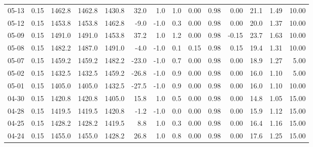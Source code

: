 \begin{threeparttable}
{\begin{tabular}{lrrrrrrrrrrrrr}
  05-13 &     0.15 & 1462.8 & 1462.8 & 1430.8 &       32.0 &                      1.0 &                 1.0 &       0.00 &      0.98 &           0.00 &             21.1 &            1.49 &                  10.00 \\
  05-12 &     0.15 & 1453.8 & 1453.8 & 1462.8 &       -9.0 &                     -1.0 &                 0.3 &       0.00 &      0.98 &           0.00 &             20.0 &            1.37 &                  10.00 \\
  05-09 &     0.15 & 1491.0 & 1491.0 & 1453.8 &       37.2 &                      1.0 &                 1.2 &       0.00 &      0.98 &          -0.15 &             23.7 &            1.63 &                  10.00 \\
  05-08 &     0.15 & 1482.2 & 1487.0 & 1491.0 &       -4.0 &                     -1.0 &                 0.1 &       0.15 &      0.98 &           0.15 &             19.4 &            1.31 &                  10.00 \\
  05-07 &     0.15 & 1459.2 & 1459.2 & 1482.2 &      -23.0 &                     -1.0 &                 0.7 &       0.00 &      0.98 &           0.00 &             18.9 &            1.27 &                   5.00 \\
  05-02 &     0.15 & 1432.5 & 1432.5 & 1459.2 &      -26.8 &                     -1.0 &                 0.9 &       0.00 &      0.98 &           0.00 &             16.0 &            1.10 &                   5.00 \\
  05-01 &     0.15 & 1405.0 & 1405.0 & 1432.5 &      -27.5 &                     -1.0 &                 0.9 &       0.00 &      0.98 &           0.00 &             16.0 &            1.10 &                  10.00 \\
  04-30 &     0.15 & 1420.8 & 1420.8 & 1405.0 &       15.8 &                      1.0 &                 0.5 &       0.00 &      0.98 &           0.00 &             14.8 &            1.05 &                  15.00 \\
  04-28 &     0.15 & 1419.5 & 1419.5 & 1420.8 &       -1.2 &                     -1.0 &                 0.0 &       0.00 &      0.98 &           0.00 &             15.9 &            1.12 &                  15.00 \\
  04-25 &     0.15 & 1428.2 & 1428.2 & 1419.5 &        8.8 &                      1.0 &                 0.3 &       0.00 &      0.98 &           0.00 &             16.4 &            1.16 &                  15.00 \\
  04-24 &     0.15 & 1455.0 & 1455.0 & 1428.2 &       26.8 &                      1.0 &                 0.8 &       0.00 &      0.98 &           0.00 &             17.6 &            1.25 &                  15.00 \\

\end{tabular}}
\end{threeparttable}
